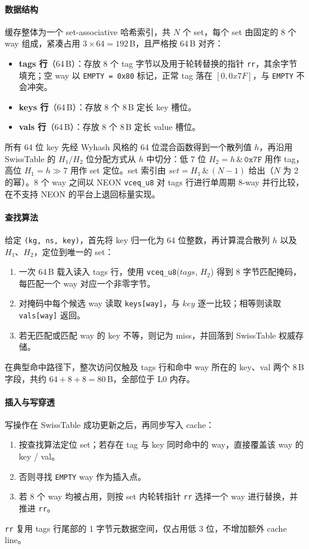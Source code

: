 \documentclass[a4paper,11pt]{article}
\begin{document}
\paragraph{数据结构}
缓存整体为一个 set-associative 哈希索引，共 $N$ 个 set，每个 set 由固定的 8 个 way 组成，紧凑占用 $3 \times 64 = 192$\,B，且严格按 64\,B 对齐：
\begin{itemize}
  \item \textbf{tags 行}（64\,B）：存放 8 个 tag 字节以及用于轮转替换的指针 \texttt{rr}，其余字节填充；空 way 以 \texttt{EMPTY = 0x80} 标记，正常 tag 落在 $[0, 0x7F]$，与 \texttt{EMPTY} 不会冲突。
  \item \textbf{keys 行}（64\,B）：存放 8 个 8\,B 定长 key 槽位。
  \item \textbf{vals 行}（64\,B）：存放 8 个 8\,B 定长 value 槽位。
\end{itemize}
所有 64 位 key 先经 Wyhash 风格的 64 位混合函数得到一个散列值 $h$，再沿用 SwissTable 的 $H_1/H_2$ 位分配方式从 $h$ 中切分：低 7 位 $H_2 = h \,\&\, \mathtt{0x7F}$ 用作 tag，高位 $H_1 = h \gg 7$ 用作 set 定位。set 索引由 $set = H_1 \,\&\, (N-1)$ 给出（$N$ 为 2 的幂）。8 个 way 之间以 NEON \texttt{vceq\_u8} 对 tags 行进行单周期 8-way 并行比较，在不支持 NEON 的平台上退回标量实现。

\paragraph{查找算法}
给定 \texttt{(kg, ns, key)}，首先将 key 归一化为 64 位整数，再计算混合散列 $h$ 以及 $H_1$、$H_2$，定位到唯一的 set：
\begin{enumerate}
  \item 一次 64\,B 载入读入 tags 行，使用 \texttt{vceq\_u8}($tags$, $H_2$) 得到 8 字节匹配掩码，每匹配一个 way 对应一个非零字节。
  \item 对掩码中每个候选 way 读取 \texttt{keys[way]}，与 $key$ 逐一比较；相等则读取 \texttt{vals[way]} 返回。
  \item 若无匹配或匹配 way 的 key 不等，则记为 miss，并回落到 SwissTable 权威存储。
\end{enumerate}
在典型命中路径下，整次访问仅触及 tags 行和命中 way 所在的 key、val 两个 8\,B 字段，共约 $64+8+8=80$\,B，全部位于 L0 内存。

\paragraph{插入与写穿透}
写操作在 SwissTable 成功更新之后，再同步写入 cache：
\begin{enumerate}
  \item 按查找算法定位 set；若存在 tag 与 key 同时命中的 way，直接覆盖该 way 的 key / val。
  \item 否则寻找 \texttt{EMPTY} way 作为插入点。
  \item 若 8 个 way 均被占用，则按 set 内轮转指针 \texttt{rr} 选择一个 way 进行替换，并推进 \texttt{rr}。
\end{enumerate}
\texttt{rr} 复用 tags 行尾部的 1 字节元数据空间，仅占用低 3 位，不增加额外 cache line。
\end{document}
